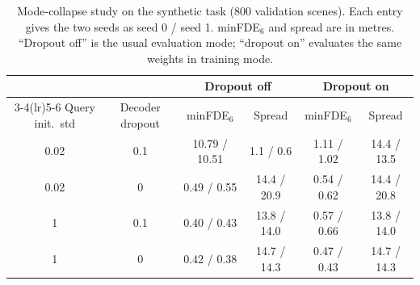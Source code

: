 \begin{table}[t]
\centering
\caption{Mode-collapse study on the synthetic task (800 validation scenes). Each entry gives
the two seeds as seed 0 / seed 1. minFDE$_6$ and spread are in metres. ``Dropout off'' is the
usual evaluation mode; ``dropout on'' evaluates the same weights in training mode.}
\label{tab:collapse}
\begin{tabular}{cc cc cc}
\toprule
 & & \multicolumn{2}{c}{Dropout off} & \multicolumn{2}{c}{Dropout on} \\
\cmidrule(lr){3-4}\cmidrule(lr){5-6}
Query init.\ std & Decoder dropout & minFDE$_6$ & Spread & minFDE$_6$ & Spread \\
\midrule
0.02 & 0.1 & 10.79 / 10.51 & 1.1 / 0.6 & 1.11 / 1.02 & 14.4 / 13.5 \\
0.02 & 0 & 0.49 / 0.55 & 14.4 / 20.9 & 0.54 / 0.62 & 14.4 / 20.8 \\
1 & 0.1 & 0.40 / 0.43 & 13.8 / 14.0 & 0.57 / 0.66 & 13.8 / 14.0 \\
1 & 0 & 0.42 / 0.38 & 14.7 / 14.3 & 0.47 / 0.43 & 14.7 / 14.3 \\
\bottomrule
\end{tabular}
\end{table}
